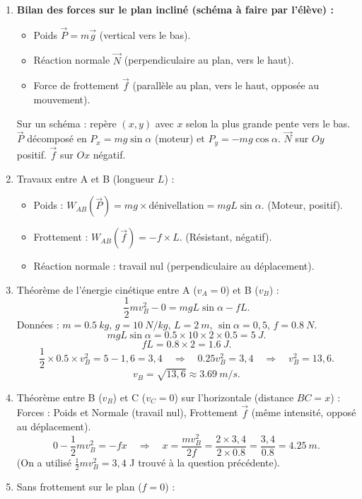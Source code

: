\documentclass[11pt]{article}
\begin{document}
\begin{corrige}
\begin{enumerate}
\item \textbf{Bilan des forces sur le plan incliné (schéma à faire par l'élève) :}
\begin{itemize}
\item Poids $\vec{P} = m\vec{g}$ (vertical vers le bas).
\item Réaction normale $\vec{N}$ (perpendiculaire au plan, vers le haut).
\item Force de frottement $\vec{f}$ (parallèle au plan, vers le haut, opposée au mouvement).
\end{itemize}
Sur un schéma : repère $(x,y)$ avec $x$ selon la plus grande pente vers le bas. $\vec{P}$ décomposé en $P_x = mg\sin\alpha$ (moteur) et $P_y = -mg\cos\alpha$. $\vec{N}$ sur $Oy$ positif. $\vec{f}$ sur $Ox$ négatif.
\item Travaux entre A et B (longueur $L$) :
\begin{itemize}
\item Poids : $W_{AB}(\vec{P}) = mg \times \text{dénivellation} = mgL\sin\alpha$. (Moteur, positif).
\item Frottement : $W_{AB}(\vec{f}) = -f \times L$. (Résistant, négatif).
\item Réaction normale : travail nul (perpendiculaire au déplacement).
\end{itemize}
\item Théorème de l'énergie cinétique entre A ($v_A=0$) et B ($v_B$) :
\[
\frac{1}{2}mv_B^2 - 0 = mgL\sin\alpha - fL.
\]
Données : $m = \SI{0,5}{kg}$, $g = \SI{10}{N/kg}$, $L = \SI{2}{m}$, $\sin\alpha = 0,5$, $f = \SI{0,8}{N}$.
\[
mgL\sin\alpha = \num{0,5} \times 10 \times 2 \times \num{0,5} = \SI{5}{J}.
\]
\[
fL = \num{0,8} \times 2 = \SI{1,6}{J}.
\]
\[
\frac{1}{2} \times \num{0,5} \times v_B^2 = 5 - 1,6 = 3,4 \quad \Rightarrow \quad \num{0,25} v_B^2 = 3,4 \quad \Rightarrow \quad v_B^2 = 13,6.
\]
\[
v_B = \sqrt{13,6} \approx \SI{3,69}{m/s}.
\]
\item Théorème entre B ($v_B$) et C ($v_C=0$) sur l'horizontale (distance $BC = x$) :
Forces : Poids et Normale (travail nul), Frottement $\vec{f}$ (même intensité, opposé au déplacement).
\[
0 - \frac{1}{2}mv_B^2 = -f x \quad \Rightarrow \quad x = \frac{mv_B^2}{2f} = \frac{2 \times 3,4}{2 \times \num{0,8}} = \frac{3,4}{\num{0,8}} = \SI{4,25}{m}.
\]
(On a utilisé $\frac{1}{2}mv_B^2 = 3,4$ J trouvé à la question précédente).
\item Sans frottement sur le plan ($f=0$) :

\end{enumerate}
\end{corrige}
\end{document}
